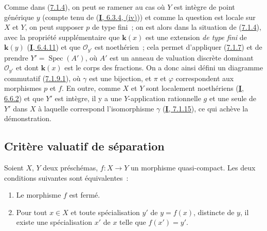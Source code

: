 Comme dans (\hyperref[II.7.1.4-fr]{7.1.4}), on peut se ramener au cas où $Y$
est intègre de point générique $y$ (compte tenu de
(\hyperref[I.6.3.4-fr]{\textbf{I}, 6.3.4, (iv)})) et comme la question est locale sur
$X$ et $Y$, on peut supposer $p$ de type fini~; on est alors dans la situation
de (\hyperref[II.7.1.4-fr]{7.1.4}), avec la propriété supplémentaire que
$\boldsymbol{k}(x)$ est une extension \emph{de type fini} de $\boldsymbol{k}(y)$
(\hyperref[I.6.4.11-fr]{\textbf{I}, 6.4.11}) et que $\mathcal{O}_{y'}$ est noethérien~;
cela permet d'appliquer (\hyperref[II.7.1.7-fr]{7.1.7}) et de prendre
$Y'=\operatorname{Spec}(A')$, où $A'$ est un anneau de valuation discrète
dominant $\mathcal{O}_{y'}$ et dont $\boldsymbol{k}(x)$ est le corps des fractions. On a
donc ainsi défini un diagramme commutatif
(\hyperref[II.7.1.9.1-fr]{7.1.9.1}), où $\gamma$ est une bijection, et $\pi$
et $\varphi$ correspondent aux morphismes $p$ et $f$. En outre, comme $X$ et
$Y$ sont localement noethériens (\hyperref[I.6.6.2-fr]{\textbf{I}, 6.6.2}) et que $Y'$
est intègre, il y a une $Y$-application rationnelle $g$ et une seule de $Y'$
dans $X$ à laquelle correspond l'isomorphisme $\gamma$
(\hyperref[I.7.1.15-fr]{\textbf{I}, 7.1.15}), ce qui achève la démonstration.

\subsection{Critère valuatif de séparation}
\label{subsection:II.7.2-fr}

\begin{proposition}[7.2.1]
\label{II.7.2.1-fr}
Soient $X$, $Y$ deux préschémas, $f:X\to Y$ un morphisme quasi-compact. Les
deux conditions suivantes sont équivalentes~:
\begin{enumerate}
\item[\rm a)] Le morphisme $f$ est fermé.
\item[\rm b)] Pour tout $x\in X$ et toute spécialisation $y'$ de $y=f(x)$,
distincte de $y$, il existe une spécialisation $x'$ de $x$ telle que
$f(x')=y'$.
\end{enumerate}
\end{proposition}


